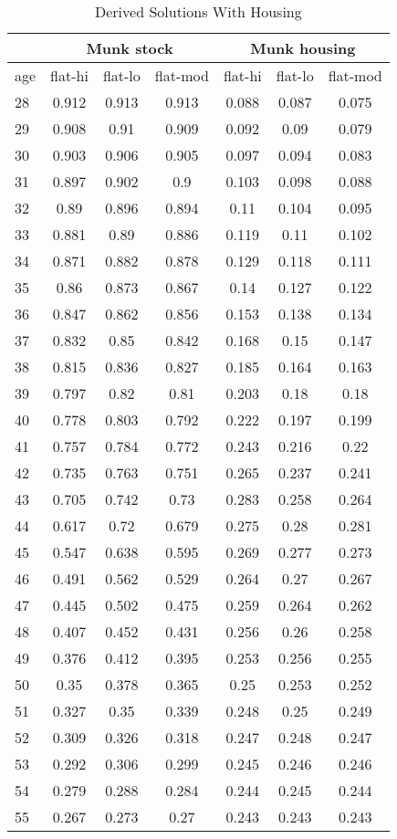 \clearpage
\renewcommand*{\arraystretch}{0.9}
\begin{longtable}{|l|ccc|ccc|}
	\caption[]{Derived Solutions With Housing}
		\hline
		&\multicolumn{3}{|c|}{Munk stock}&\multicolumn{3}{c|}{Munk housing}\\
		\hline
		age&flat-hi&flat-lo&flat-mod&flat-hi&flat-lo&flat-mod\\
		\hline
28&0.912&0.913&0.913&0.088&0.087&0.075\\
29&0.908&0.91&0.909&0.092&0.09&0.079\\
30&0.903&0.906&0.905&0.097&0.094&0.083\\
31&0.897&0.902&0.9&0.103&0.098&0.088\\
32&0.89&0.896&0.894&0.11&0.104&0.095\\
33&0.881&0.89&0.886&0.119&0.11&0.102\\
34&0.871&0.882&0.878&0.129&0.118&0.111\\
35&0.86&0.873&0.867&0.14&0.127&0.122\\
36&0.847&0.862&0.856&0.153&0.138&0.134\\
37&0.832&0.85&0.842&0.168&0.15&0.147\\
38&0.815&0.836&0.827&0.185&0.164&0.163\\
39&0.797&0.82&0.81&0.203&0.18&0.18\\
40&0.778&0.803&0.792&0.222&0.197&0.199\\
41&0.757&0.784&0.772&0.243&0.216&0.22\\
42&0.735&0.763&0.751&0.265&0.237&0.241\\
43&0.705&0.742&0.73&0.283&0.258&0.264\\
44&0.617&0.72&0.679&0.275&0.28&0.281\\
45&0.547&0.638&0.595&0.269&0.277&0.273\\
46&0.491&0.562&0.529&0.264&0.27&0.267\\
47&0.445&0.502&0.475&0.259&0.264&0.262\\
48&0.407&0.452&0.431&0.256&0.26&0.258\\
49&0.376&0.412&0.395&0.253&0.256&0.255\\
50&0.35&0.378&0.365&0.25&0.253&0.252\\
51&0.327&0.35&0.339&0.248&0.25&0.249\\
52&0.309&0.326&0.318&0.247&0.248&0.247\\
53&0.292&0.306&0.299&0.245&0.246&0.246\\
54&0.279&0.288&0.284&0.244&0.245&0.244\\
55&0.267&0.273&0.27&0.243&0.243&0.243\\

\end{longtable}
